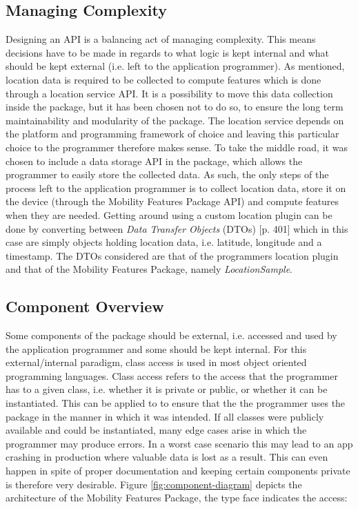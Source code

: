 \subsection{Managing Complexity}
Designing an API is a balancing act of managing complexity. This means decisions have to be made in regards to what logic is kept internal and what should be kept external (i.e. left to the application programmer). As mentioned, location data is required to be collected to compute features which is done through a location service API. It is a possibility to move this data collection inside the package, but it has been chosen not to do so, to ensure the long term maintainability and modularity of the package. The location service depends on the platform and programming framework of choice and leaving this particular choice to the programmer therefore makes sense. To take the middle road, it was chosen to include a data storage API in the package, which allows the programmer to easily store the collected data. As such, the only steps of the process left to the application programmer is to collect location data, store it on the device (through the Mobility Features Package API) and compute features when they are needed. Getting around using a custom location plugin can be done by converting between \textit{Data Transfer Objects} (DTOs) \cite{fowler-PEEA} [p. 401] which in this case are simply objects holding location data, i.e. latitude, longitude and a timestamp. The DTOs considered are that of the programmers location plugin and that of the Mobility Features Package, namely \textit{LocationSample}.

\subsection{Component Overview}
Some components of the package should be external, i.e. accessed and used by the application programmer and some should be kept internal. For this external/internal paradigm, class access is used in most object oriented programming languages. Class access refers to the access that the programmer has to a given class, i.e. whether it is private or public, or whether it can be instantiated. This can be applied to to ensure that the the programmer uses the package in the manner in which it was intended. If all classes were publicly available and could be instantiated, many edge cases arise in which the programmer may produce errors. In a worst case scenario this may lead to an app  crashing in production where valuable data is lost as a result. This can even happen in spite of proper documentation and keeping certain components private is therefore very desirable. Figure \ref{fig:component-diagram} depicts the architecture of the Mobility Features Package, the type face indicates the access: 
 
